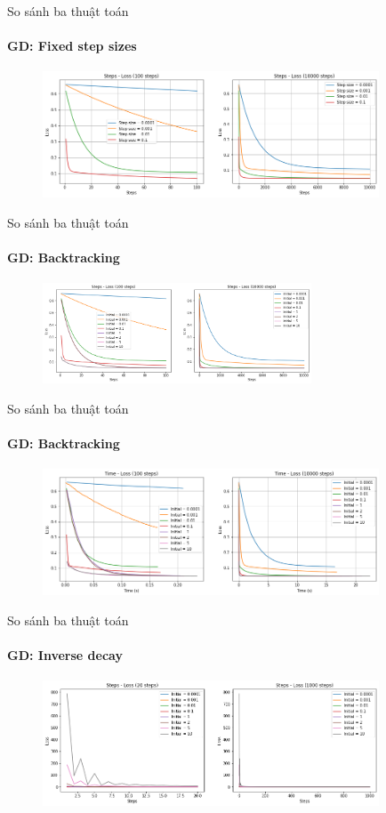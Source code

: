 \documentclass[10pt]{beamer}
\theoremstyle{remark}
\theoremstyle{definition}
\begin{document}
\begin{frame}{So sánh ba thuật toán}
	\framesubtitle{GD: Fixed step sizes}

	  \begin{figure}
		\centering
		\includegraphics[width=10cm]{Thinh/4.png}
	  \end{figure}
\end{frame}

\begin{frame}{So sánh ba thuật toán}
	\framesubtitle{GD: Backtracking}
	\begin{figure}
		\centering
		\includegraphics[width=8cm]{Thinh/5.png}
	\end{figure}

\end{frame}

\begin{frame}{So sánh ba thuật toán}
	\framesubtitle{GD: Backtracking}
	\begin{figure}
		\centering
		\includegraphics[width=10cm]{Thinh/6.png}
	\end{figure}
\end{frame}

\begin{frame}{So sánh ba thuật toán}
	\framesubtitle{GD: Inverse decay}
	\begin{figure}
		\centering
		\includegraphics[width=10cm]{Thinh/7.png}
	\end{figure}
\end{frame}
\end{document}
